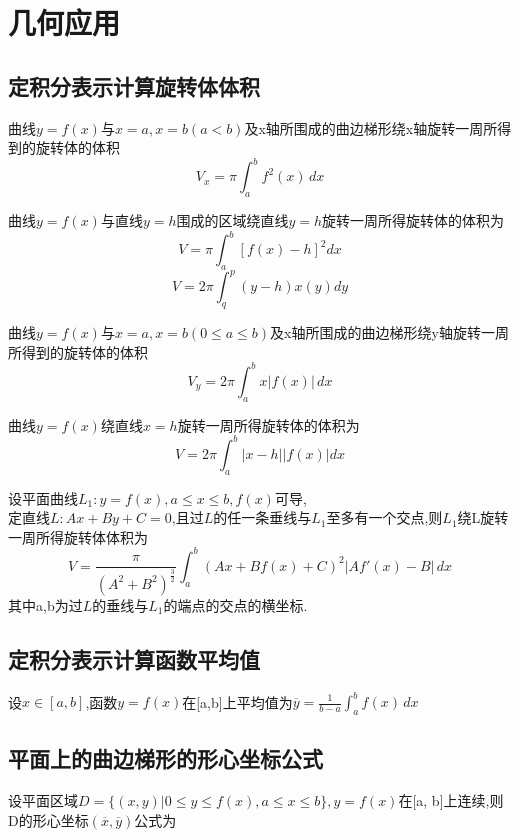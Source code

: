 \section{几何应用}

\subsection{定积分表示计算旋转体体积}

曲线\(y=f(x)\)与\(x=a,x=b(a < b)\)及x轴所围成的曲边梯形绕x轴旋转一周所得到的旋转体的体积
\begin{displaymath}
V_{x} = \pi \int_{a}^{b} f^{2}(x) \,dx
\end{displaymath}

曲线\(y = f(x)\)与直线\(y = h\)围成的区域绕直线\(y = h\)旋转一周所得旋转体的体积为\[V = \pi\int_a^b[f(x) - h]^2dx\]
\[V = 2\pi\int_q^p(y - h)x(y)dy\]

曲线\(y=f(x)\)与\(x=a,x=b(0 \leq a \leq b)\)及x轴所围成的曲边梯形绕y轴旋转一周所得到的旋转体的体积
\begin{displaymath}
V_{y} = 2\pi \int_{a}^{b} x \lvert f(x) \rvert \,dx
\end{displaymath}

曲线\(y = f(x)\)绕直线\(x = h\)旋转一周所得旋转体的体积为\[V = 2\pi\int_a^b|x - h||f(x)|dx\]

设平面曲线\(L_1 : y = f(x), a \leq x \leq b, f(x)\)可导, \\
定直线\(L : Ax + By + C = 0\),且过\(L\)的任一条垂线与\(L_1\)至多有一个交点,则\(L_1\)绕L旋转一周所得旋转体体积为
\begin{displaymath}
V = \frac{\pi}{(A^2 + B^2)^{\frac{3}{2}}}
\int_{a}^{b} (Ax + Bf(x) + C)^2 \lvert Af'(x) - B \rvert \,dx
\end{displaymath}
其中a,b为过\(L\)的垂线与\(L_1\)的端点的交点的横坐标.


\subsection{定积分表示计算函数平均值}

设\(x \in [a, b]\),函数\(y = f(x)\)在[a,b]上平均值为\(\overline{y} = \frac{1}{b- a} \int_{a}^{b} f(x) \,dx\)


\subsection{平面上的曲边梯形的形心坐标公式}

设平面区域\(D = \{ (x, y) | 0 \leq y \leq f(x), a \leq x \leq b \}, y = f(x)\)在[a, b]上连续,则D的形心坐标\((\overline{x}, \overline{y})\)公式为

